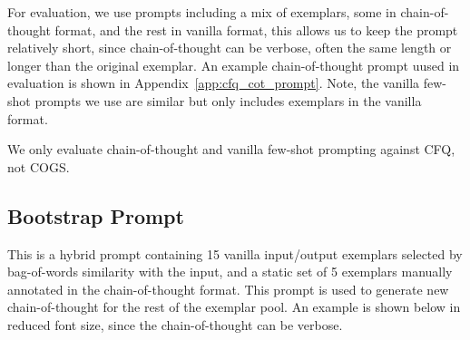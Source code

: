 \documentclass{article} \usepackage{iclr2022_conference,times}
\begin{document}
For evaluation, we use prompts including a mix of exemplars, some in chain-of-thought format, and the rest in vanilla format, this allows us to keep the prompt relatively short, since chain-of-thought can be verbose, often the same length or longer than the original exemplar. An example chain-of-thought prompt uused in evaluation is shown in Appendix~\ref{app:cfq_cot_prompt}. Note, the vanilla few-shot prompts we use are similar but only includes exemplars in the vanilla format.

We only evaluate chain-of-thought and vanilla few-shot prompting against CFQ, not COGS.

\subsection{Bootstrap Prompt \label{app:cfq_cot_bootsrap_prompt}}

This is a hybrid prompt containing 15 vanilla input/output exemplars selected by bag-of-words similarity with the input, and a static set of 5 exemplars manually annotated in the chain-of-thought format. This prompt is used to generate new chain-of-thought for the rest of the exemplar pool. An example is shown below in reduced font size, since the chain-of-thought can be verbose.
\end{document}
